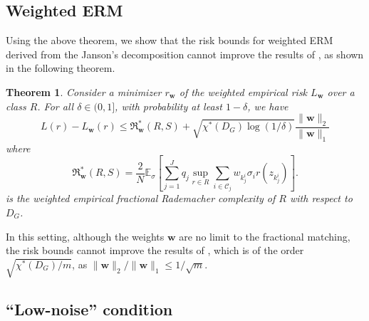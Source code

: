 \documentclass[letterpaper]{article} %
\newtheorem{theorem}{Theorem}
\newcommand{\E}{\mathbb{E}}
\newcommand{\weight}{\mathbf{w}}
\newcommand{\empiricalrisk}[1]{L_{#1}}
\newcommand{\risk}{L}
\newcommand{\rademacher}{\sigma}
\newcommand{\normo}[1]{\|#1\|_1}
\newcommand{\fcoloring}{\chi^*}
\newcommand{\rademachercomplexity}{\mathfrak{R}}
\begin{document}
\subsection{Weighted ERM} %
\label{sub:weighted_erm}

Using the above theorem, we show that the risk bounds for weighted ERM derived from the Janson's decomposition cannot improve the results of \cite{Usunier2005}, as shown in the following theorem.

\begin{theorem}
\label{th:fractional_coloring_weighted}
  Consider a minimizer $r_\weight{}$ of the weighted empirical risk $\empiricalrisk{\weight{}}$ over a class $R$. For all $\delta\in (0,1]$, with probability at least $1-\delta$, we have
  \[\risk{}(r)-\empiricalrisk{\weight{}}(r)\le \rademachercomplexity_{\weight{}}^*(R,S)+\sqrt{\fcoloring(D_G)\log(1/\delta)}\frac{\|\weight{}\|_2}{\normo{\weight{}}}\]
  where
  \[\rademachercomplexity_{\weight{}}^*(R, S) = \frac{2}{N}\E_\rademacher{}\left[\sum_{j=1}^J q_j\sup_{r\in R} \sum_{i\in \mathcal{C}_j}w_{k_j^i}\rademacher{}_i r(z_{k_j^i})\right].\]
  is the weighted empirical fractional Rademacher complexity of $R$ with respect to $D_G$.
\end{theorem}

In this setting, although the weights $\weight{}$ are no limit to the fractional matching, the risk bounds cannot improve the results of \cite{Usunier2005}, which is of the order $\sqrt{\fcoloring{}(D_G)/m}$, as $\|\weight\|_2/\normo{\weight{}}\le 1/\sqrt{m}$.

\subsection{``Low-noise'' condition} %
\label{sub:low_noise_condition}
\end{document}
